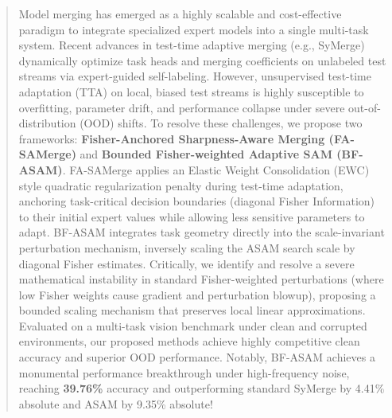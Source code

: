 \documentclass{article}
\theoremstyle{plain}
\theoremstyle{definition}
\theoremstyle{remark}
\begin{document}

\printAffiliationsAndNotice{}

\makeatletter
\gdef\@icmltitlerunning{Fisher-Anchored Sharpness-Aware Test-Time Merging}
\makeatother

\begin{abstract}
  Model merging has emerged as a highly scalable and cost-effective paradigm to integrate specialized expert models into a single multi-task system. Recent advances in test-time adaptive merging (e.g., SyMerge) dynamically optimize task heads and merging coefficients on unlabeled test streams via expert-guided self-labeling. However, unsupervised test-time adaptation (TTA) on local, biased test streams is highly susceptible to overfitting, parameter drift, and performance collapse under severe out-of-distribution (OOD) shifts. To resolve these challenges, we propose two frameworks: \textbf{Fisher-Anchored Sharpness-Aware Merging (FA-SAMerge)} and \textbf{Bounded Fisher-weighted Adaptive SAM (BF-ASAM)}. FA-SAMerge applies an Elastic Weight Consolidation (EWC) style quadratic regularization penalty during test-time adaptation, anchoring task-critical decision boundaries (diagonal Fisher Information) to their initial expert values while allowing less sensitive parameters to adapt. BF-ASAM integrates task geometry directly into the scale-invariant perturbation mechanism, inversely scaling the ASAM search scale by diagonal Fisher estimates. Critically, we identify and resolve a severe mathematical instability in standard Fisher-weighted perturbations (where low Fisher weights cause gradient and perturbation blowup), proposing a bounded scaling mechanism that preserves local linear approximations. Evaluated on a multi-task vision benchmark under clean and corrupted environments, our proposed methods achieve highly competitive clean accuracy and superior OOD performance. Notably, BF-ASAM achieves a monumental performance breakthrough under high-frequency noise, reaching \textbf{39.76\%} accuracy and outperforming standard SyMerge by 4.41\% absolute and ASAM by 9.35\% absolute!
\end{abstract}
\end{document}
